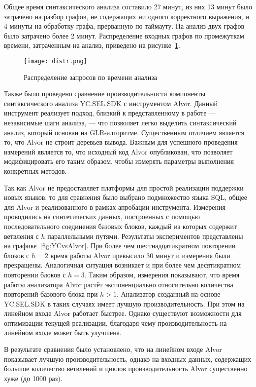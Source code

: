 Общее время синтаксического анализа составило 27 минут, из них 13 минут было затрачено на разбор графов, не содержащих ни одного корректного выражения, и 4 минуты на обработку графа, прерванную по таймауту. На анализ двух графов было затрачено более 2 минут. Распределение входных графов по промежуткам времени, затраченным на анализ, приведено на рисунке~\ref{distr}.

\begin{figure}[]
  \centering
 \texttt{[image: distr.png]}
 \caption{Распределение запросов по времени анализа}
 \label{distr}
\end{figure}


Также было проведено сравнение производительности компоненты синтаксического анализа YC.SEL.SDK с инструментом Alvor. Данный инструмент реализует подход, близкий к представленному в работе --- независимые шаги анализа, --- что позволяет легко выделить синтаксический анализ, который основан на GLR-алгоритме. Существенным отличием является то, что Alvor не строит деревьев вывода. Важным для успешного проведения измерений является то, что исходный код Alvor опубликован, что позволяет модифицировать его таким образом, чтобы измерять параметры выполнения конкретных методов. 

Так как Alvor не предоставляет платформы для простой реализации поддержки новых языков, то для сравнения было выбрано подмножество языка SQL, общее для Alvor и реализованного в рамках апробации инструмента. 
Измерения проводились на синтетических данных, построенных с помощью последовательного соединения базовых блоков, каждый из которых содержит ветвления с $h$ параллельными путями. Результаты экспериментов 
представлены на графике~\ref{fig:YCvsAlvor}. При более чем шестнадцатикратном повторении блоков с $h=2$ время работы Alvor превысило 30 минут и измерения были прекращены. Аналогичная ситуация возникает и при 
более чем десятикратном повторении блоков с $h=3$. Таким образом, измерения показывают, что время работы анализатора Alvor растёт экспоненциально относительно количества повторений базового блока при $h>1$. 
Анализатор созданный на основе YC.SEL.SDK в таких случаях имеет лучшую производительность. При этом на линейном входе Alvor работает быстрее. Однако существуют возможности для оптимизации текущей реализации, благодаря чему производительность на линейном входе может быть улучшена.

В результате сравнения было установлено, что на линейном входе Alvor показывает лучшую производительность, однако на входных данных, содержащих большое количество ветвлений и циклов производительность Alvor существенно хуже (до 1000 раз).

